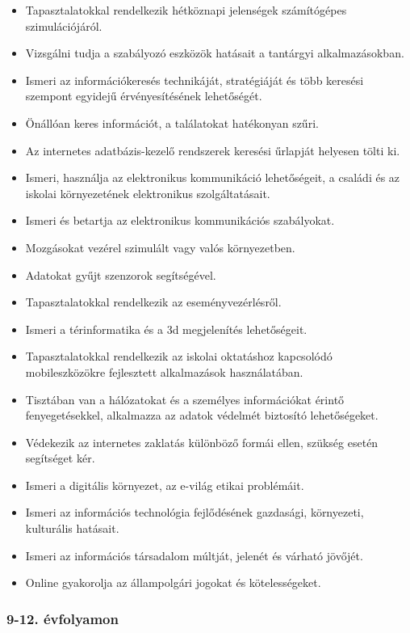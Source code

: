 \begin{itemize}
\item
  Tapasztalatokkal rendelkezik hétköznapi jelenségek számítógépes
  szimulációjáról.
\item
  Vizsgálni tudja a szabályozó eszközök hatásait a tantárgyi
  alkalmazásokban.
\item
  Ismeri az információkeresés technikáját, stratégiáját és több keresési
  szempont egyidejű érvényesítésének lehetőségét.
\item
  Önállóan keres információt, a találatokat hatékonyan szűri.
\item
  Az internetes adatbázis-kezelő rendszerek keresési űrlapját helyesen
  tölti ki.
\item
  Ismeri, használja az elektronikus kommunikáció lehetőségeit, a családi
  és az iskolai környezetének elektronikus szolgáltatásait.
\item
  Ismeri és betartja az elektronikus kommunikációs szabályokat.
\item
  Mozgásokat vezérel szimulált vagy valós környezetben.
\item
  Adatokat gyűjt szenzorok segítségével.
\item
  Tapasztalatokkal rendelkezik az eseményvezérlésről.
\item
  Ismeri a térinformatika és a 3d megjelenítés lehetőségeit.
\item
  Tapasztalatokkal rendelkezik az iskolai oktatáshoz kapcsolódó
  mobileszközökre fejlesztett alkalmazások használatában.
\item
  Tisztában van a hálózatokat és a személyes információkat érintő
  fenyegetésekkel, alkalmazza az adatok védelmét biztosító
  lehetőségeket.
\item
  Védekezik az internetes zaklatás különböző formái ellen, szükség
  esetén segítséget kér.
\item
  Ismeri a digitális környezet, az e-világ etikai problémáit.
\item
  Ismeri az információs technológia fejlődésének gazdasági, környezeti,
  kulturális hatásait.
\item
  Ismeri az információs társadalom múltját, jelenét és várható jövőjét.
\item
  Online gyakorolja az állampolgári jogokat és kötelességeket.
\end{itemize}

\hypertarget{evfolyamon-5}{%
\subsubsection{9-12. évfolyamon}\label{evfolyamon-5}}

